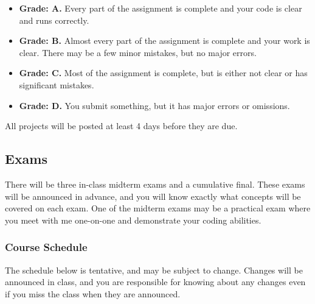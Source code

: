 \documentclass[10pt]{article}
\begin{document}
\begin{itemize}
\item \textbf{Grade: A.} Every part of the assignment is complete and your code is clear and runs correctly.  
\item \textbf{Grade: B.} Almost every part of the assignment is complete and your work is clear. There may be a few minor mistakes, but no major errors.  
\item \textbf{Grade: C.} Most of the assignment is complete, but is either not clear or has significant mistakes.
\item \textbf{Grade: D.} You submit something, but it has major errors or omissions.  
\end{itemize}
 
\noindent
All projects will be posted at least 4 days before they are due.  


\subsection*{Exams}

There will be three in-class midterm exams and a cumulative final. These exams will be announced in advance, and you will know exactly what concepts will be covered on each exam.  One of the midterm exams may be a practical exam where you meet with me one-on-one and demonstrate your coding abilities. 

\subsubsection*{Course Schedule} 

The schedule below is tentative, and may be subject to change. Changes will be announced in class, and you are responsible for knowing about any changes even if you miss the class when they are announced. 
\end{document}
